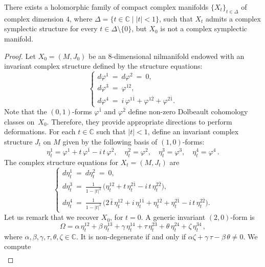 \documentclass[10pt,a4paper]{amsart}
\begin{document}
\begin{theorem}\label{hs-no-cerrada}
There exists a holomorphic family of compact complex manifolds $\{X_{t}\}_{t\in\Delta}$ of complex
dimension $4$, where $\Delta=\{t\in\mathbb C\mid |t|<1\}$, such that $X_{t}$ admits a complex
symplectic structure for every $t\in\Delta\setminus\{0\}$, but $X_{0}$ is not a complex symplectic manifold.
\end{theorem}

\begin{proof}
Let $X_{0}=(M,J_{0})$ be an $8$-dimensional nilmanifold endowed with an invariant complex structure defined
by the structure equations:
\[
\left\{\begin{array}{l}
d\varphi^1 \ = \ d\varphi^2 \ = \ 0,\\
d\varphi^3 \ = \ \varphi^{12},\\
d\varphi^4 \ = \ i\,\varphi^{1\bar1}+\varphi^{1\bar2}+\varphi^{2\bar1}.
\end{array}\right.
\]
Note that the $(0,1)$-forms $\varphi^{\bar1}$ and $\varphi^{\bar 2}$ define non-zero Dolbeault cohomology classes on~$X_{0}$. Therefore, they provide appropriate directions to perform deformations. For each $t\in\mathbb C$ such that $|t|<1$, define an invariant complex structure $J_{t}$ on $M$ given by the following
basis of $(1,0)$-forms:
\[
\eta_t^1=\varphi^1+t\,\varphi^{\bar1}-i\,t\,\varphi^{\bar2}, \quad \eta_t^2=\varphi^2, \quad 
    \eta_t^3=\varphi^3, \quad \eta_t^4=\varphi^4\,.
\]
The complex structure equations for $X_{t}=(M,J_{t})$ are
\begin{equation}\label{def-hs-no-cerrada}
\left\{\begin{array}{l}
d\eta_t^1 \ = \ d\eta_t^2 \ = \ 0,\\
d\eta_t^3 \ = \ \frac{1}{1-|t|^2}\,\big(\eta_t^{12}+t\,\eta_t^{2\bar1}-i\,t\,\eta_t^{2\bar2}\big),\\
d\eta_t^4 \ = \ \frac{1}{1-|t|^2}\,\big(2\,\bar t\,\eta_t^{12}+i\,\eta_t^{1\bar1}
   +\eta_t^{1\bar2}+\eta_t^{2\bar1}-i\,t\,\eta_t^{2\bar2} \big).
\end{array}\right.
\end{equation}
Let us remark that we recover $X_{0}$, for $t=0$. A generic invariant $(2,0)$-form is
\[
\Omega=\alpha\,\eta_t^{12}+\beta\,\eta_t^{13}+\gamma\,\eta_t^{14}+\tau\,\eta_t^{23}
    +\theta\,\eta_t^{24}+\zeta\,\eta_t^{34}\,,
\]
where $\alpha,\beta,\gamma,\tau,\theta,\zeta\in\mathbb C$. It is non-degenerate if and only if $\alpha \zeta+\gamma\,\tau-\beta\,\theta\neq 0$. We compute
\[
\begin{array}{lcl}

\end{array}\]
\end{proof}
\end{document}
